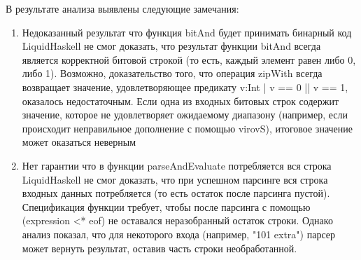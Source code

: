 \documentclass[areasetadvanced]{scrartcl}
\begin{document}
В результате анализа выявлены следующие замечания:
\begin{enumerate}
    \item Недоказанный результат что функция bitAnd будет принимать бинарный код
    \subitem LiquidHaskell не смог доказать, что результат функции bitAnd всегда
    является корректной битовой строкой (то есть, каждый элемент равен либо 0, либо 1).
    Возможно, доказательство того, что операция zipWith всегда возвращает значение, удовлетворяющее предикату {v:Int | v == 0 || v == 1}, оказалось недостаточным. Если одна из входных битовых строк содержит значение, которое не удовлетворяет ожидаемому диапазону (например, если происходит неправильное дополнение с помощью virovS), итоговое значение может оказаться неверным
    \item  Нет гарантии что в функции parseAndEvaluate потребляется вся строка
    \subitem LiquidHaskell не смог доказать, что при успешном парсинге вся строка входных данных потребляется (то есть остаток после парсинга пустой).
    Спецификация функции требует, чтобы после парсинга с помощью (expression <* eof) не оставался неразобранный остаток строки. Однако анализ показал, что для некоторого входа (например, "101 extra") парсер может вернуть результат, оставив часть строки необработанной.
\end{enumerate}

\newpage 
\end{document}
